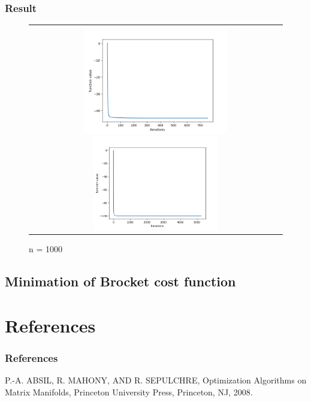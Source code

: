 \documentclass[dvipdfmx,11pt]{beamer}		%
\begin{document}
    \begin{frame}
        \frametitle{Result}
        \begin{figure}[b]
            \begin{tabular}{c}
                \begin{minipage}{0.55\hsize}
                    \centering
                    \caption{n = 1000}
                    \includegraphics[width = 6.3cm]{../Images/quad_1000.png}
                \end{minipage}
                \begin{minipage}{0.45\hsize}
                    \centering
                    \includegraphics[width = 5.5cm]{../Images/quad_5000.png}
                \end{minipage}
            \end{tabular}   
        \end{figure}  
    \end{frame}
    \subsection{Minimation of Brocket cost function}

    \section*{References}
    \begin{frame}\frametitle{References}
        \begin{thebibliography}{9}
            \beamertemplatetextbibitems
             P.-A. ABSIL, R. MAHONY, AND R. SEPULCHRE, Optimization Algorithms on Matrix Manifolds, 
                       Princeton University Press, Princeton, NJ, 2008.
	    \end{thebibliography}
    \end{frame}
\end{document}
